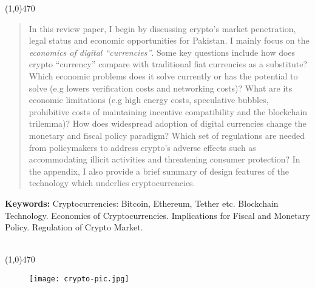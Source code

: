 \documentclass[12pt]{article}
\newcommand{\1}{\mathbbm 1}
\begin{document}
		

		

	
	
	
		
		\begin{center}
			\line(1,0){470}
		\end{center}
		\begin{spacing}{1.1}
			\vspace{-3ex}
			\begin{abstract}
				\noindent 
				In this review paper, I begin by discussing crypto's market penetration, legal status and economic opportunities for Pakistan. I mainly focus on the \textit{economics of digital ``currencies''}. Some key questions include how does crypto ``currency'' compare with traditional fiat currencies as a substitute? Which economic problems does it solve currently or has the potential to solve (e.g lowers verification costs and networking costs)? What are its economic limitations (e.g high energy costs, speculative bubbles, prohibitive costs of maintaining incentive compatibility and the blockchain trilemma)? How does widespread adoption of digital currencies change the monetary and fiscal policy paradigm? Which set of regulations are needed from policymakers to address crypto's adverse effects such as accommodating illicit activities and threatening consumer protection? In the appendix, I also provide a brief summary of design features of the technology which underlies cryptocurrencies.
			\end{abstract}
		\end{spacing}
		\textbf{Keywords:} Cryptocurrencies: Bitcoin, Ethereum, Tether etc. Blockchain Technology. Economics of Cryptocurrencies. Implications for Fiscal and Monetary Policy. Regulation of Crypto Market. {}\\
		\\
		\begin{center}
			\vspace{-8ex}
			\line(1,0){470}
		\end{center}
		\baselineskip=18pt 
		
		\newpage{}
		
			\begin{figure}[H]
			\begin{center}
				\texttt{[image: crypto-pic.jpg]}		
				\caption*{}
			\end{center}
		\end{figure}
		
\end{document}
